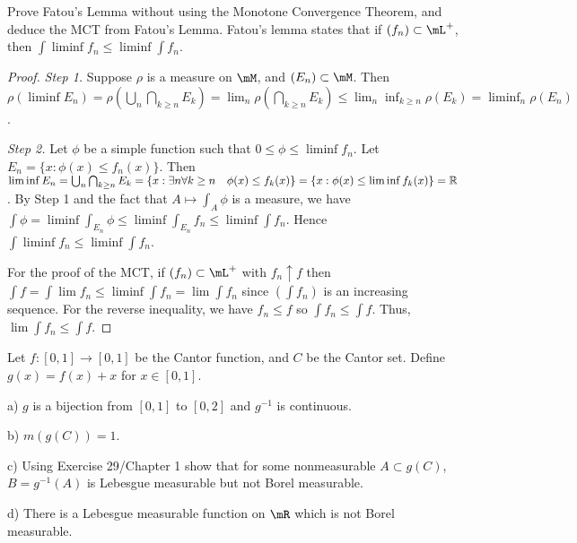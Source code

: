 \documentclass{article}
\begin{document}
 Prove Fatou's Lemma without using the Monotone Convergence Theorem, and deduce the MCT from Fatou's Lemma. Fatou's lemma states that if $(f_n) \subset \mL^+$, then $\int \liminf f_n \le \liminf \int f_n$.
\begin{proof}
\emph{Step 1.} Suppose $\rho$ is a measure on $\mM$, and $(E_n) \subset \mM$. Then $\rho(\liminf E_n) = \rho(\bigcup_n \bigcap_{k \ge n} E_k)  = \lim_n \rho(\bigcap_{k \ge n} E_k)  \le  \lim_n \inf_{k \ge n} \rho(E_k) = \liminf_n \rho(E_n)$.

\emph{Step 2.} Let $\phi$ be a simple function such that $0 \le \phi \le \liminf f_n$.  Let $E_n = \{x : \phi(x) \le f_n(x) \}$.  Then $\liminf E_n = \bigcup_n \bigcap_{k \ge n} E_k = \{x : \exists n \forall k \ge n \quad \phi(x) \le f_k(x) \} = \{x : \phi(x) \le \liminf f_k(x)\} = \mathbb{R}$.  
 By Step 1 and the fact that $A \mapsto \int_A \phi$ is a measure, we have $\int \phi = \liminf \int_{E_n} \phi \le \liminf \int_{E_n} f_n \le \liminf \int f_n$. Hence $\int \liminf f_n \le \liminf \int f_n$.

For the proof of the MCT, if $(f_n) \subset \mL^+$ with $f_n \uparrow f$ then $\int f = \int \lim f_n \le \liminf \int f_n = \lim \int f_n$ since $(\int f_n)$ is an increasing sequence. For the reverse inequality, we have $f_n \le f$ so $\int f_n \le \int f$. Thus, $\lim \int f_n \le \int f$.
\end{proof}

 Let $f : [0,1] \to [0,1]$ be the Cantor function, and $C$ be the Cantor set.  Define $g(x) = f(x) + x$ for $x \in [0,1]$.

a) $g$ is a bijection from $[0,1]$ to $[0,2]$ and $g^{-1}$ is continuous.

b) $m(g(C)) = 1$.

c) Using Exercise 29/Chapter 1 show that for some nonmeasurable $A \subset g(C)$, $B = g^{-1}(A)$ is Lebesgue measurable but not Borel measurable.

d) There is a Lebesgue measurable function on $\mR$ which is not Borel measurable.
\end{document}
